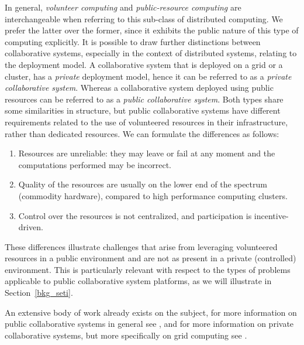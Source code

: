 \documentclass[12pt, titlepage]{uo_temp}
\begin{document}
     In general, \emph{volunteer computing} and \emph{public-resource computing} are
     interchangeable when referring to this sub-class of distributed computing. We prefer
     the latter over the former, since it exhibits the public nature of this type of
     computing explicitly.
     It is possible to draw further distinctions between collaborative systems, especially
     in the context of distributed systems, relating to the deployment model.
     A collaborative system that is deployed on a grid or a cluster, has a \emph{private}
     deployment model, hence it can be referred to as a \emph{private collaborative
       system}.
     Whereas a collaborative system deployed using public resources can be referred to as
     a \emph{public collaborative system}.
     Both types share some similarities in structure, but public collaborative systems
     have different requirements related to the use of volunteered resources in their
     infrastructure, rather than dedicated resources. We can formulate the differences as
     follows:
     \begin{enumerate}
     \item Resources are unreliable: they may leave or fail at any moment and the
       computations performed may be incorrect.
     \item Quality of the resources are usually on the lower end of the spectrum
       (commodity hardware), compared to high performance computing clusters.
     \item Control over the resources is not centralized, and participation is
       incentive-driven.
     \end{enumerate}
     These differences illustrate challenges that arise from leveraging volunteered
     resources in a public environment and are not as present in a private (controlled)
     environment. This is particularly relevant with respect to the types of problems
     applicable to public collaborative system platforms, as we will illustrate in
     Section~\ref{bkg_seti}.

     An extensive body of work already exists on the subject, for more information on
     public collaborative systems in general see \cite{anderson2003public}
     \cite{anderson2006computational}, and for more information on private collaborative
     systems, but more specifically on grid computing see \cite{berman2003grid}.
\end{document}
